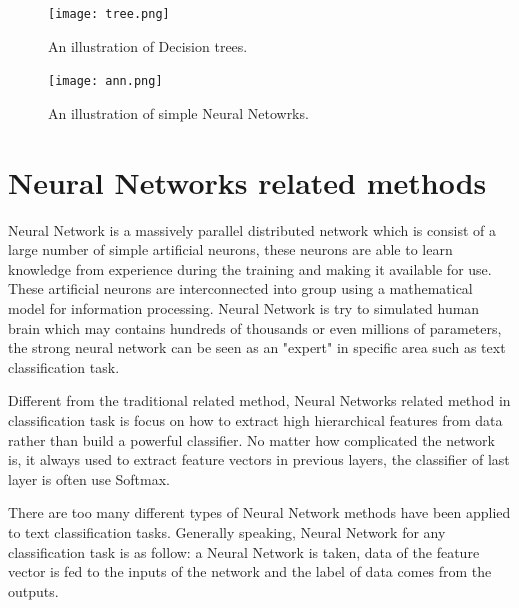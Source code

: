 \documentclass[senior]{IPSstyle}
\begin{document}
\begin{figure}[t]
  \centering
  \texttt{[image: tree.png]}\\
  \caption{An illustration of Decision trees.}\label{NBde}
\end{figure}



\begin{figure}[t]
  \centering
  \texttt{[image: ann.png]}\\
  \caption{An illustration of simple Neural Netowrks.}\label{NBde}
\end{figure}

\section{Neural Networks related methods}

Neural Network is a massively parallel distributed network which is consist of  a large number of simple artificial neurons, these neurons are able to learn knowledge from experience during the training and making it available for use. These artificial  neurons  are  interconnected into  group  using  a  mathematical model for information processing. Neural Network is try to simulated human brain which may contains hundreds of thousands or even millions of parameters, the strong neural network can be seen as an "expert" in specific area such as text classification task.

Different from the traditional related method, Neural Networks related method in classification task is focus on how to extract high hierarchical features from data rather than build a powerful classifier. No matter how complicated the network is, it always used to extract feature vectors in previous layers, the classifier of last layer is often use Softmax. 

There are too many different  types  of  Neural  Network  methods  have  been  applied  to  text  classification  tasks. Generally speaking,  Neural  Network for any classification task is as follow: a Neural  Network is taken, data of the feature vector is fed to the inputs of the network and the label of data comes from the outputs.
\end{document}
